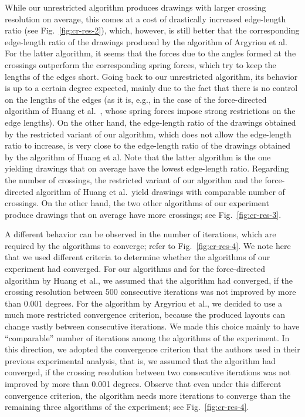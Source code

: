 \documentclass{comjnl}
\begin{document}
While our unrestricted algorithm produces drawings with larger crossing resolution on average, this comes at a cost of drastically increased edge-length ratio (see Fig.~\ref{fig:cr-res-2}), which, however, is still better that the corresponding edge-length ratio of the drawings produced by the algorithm of Argyriou et al. For the latter algorithm, it seems that the forces due to the angles formed at the crossings outperform the corresponding spring forces, which try to keep the lengths of the edges short. Going back to our unrestricted algorithm, its behavior is up to a certain degree expected, mainly due to the fact that there is no control on the lengths of the edges (as it is, e.g., in the case of the force-directed algorithm of Huang et al.~\cite{DBLP:journals/vlc/HuangEHL13}, whose spring forces impose strong restrictions on the edge lengths). On the other hand, the edge-length ratio of the drawings obtained by the restricted variant of our algorithm, which does not allow the edge-length ratio to increase, is very close to the edge-length ratio of the drawings obtained by the algorithm of Huang et al. Note that the latter algorithm is the one yielding drawings that on average have the lowest edge-length ratio. Regarding the number of crossings, the restricted variant of our algorithm and the force-directed algorithm of Huang et al.\ yield drawings with comparable number of crossings. On the other hand, the two other algorithms of our experiment produce drawings that on average have more crossings; see Fig.~\ref{fig:cr-res-3}.

A different behavior can be observed in the number of iterations, which are required by the algorithms to converge; refer to Fig.~\ref{fig:cr-res-4}. We note here that we used different criteria to determine whether the algorithms of our experiment had converged. For our algorithms and for the force-directed algorithm by Huang et al., we assumed that the algorithm had converged, if the crossing resolution between 500 consecutive iterations was not improved by more than 0.001 degrees. For the algorithm by Argyriou et al., we decided to use a much more restricted convergence criterion, because the produced layouts can change vastly between  consecutive iterations. We made this choice mainly to have ``comparable'' number of iterations among the algorithms of the experiment. In this direction, we adopted the convergence criterion that the authors used in their previous experimental analysis, that is, we assumed that the algorithm had converged, if the crossing resolution between two consecutive iterations was not improved by more than 0.001 degrees. Observe that even under this different convergence criterion, the algorithm needs more iterations to converge than the remaining three algorithms of the experiment; see Fig.~\ref{fig:cr-res-4}. 
\end{document}
